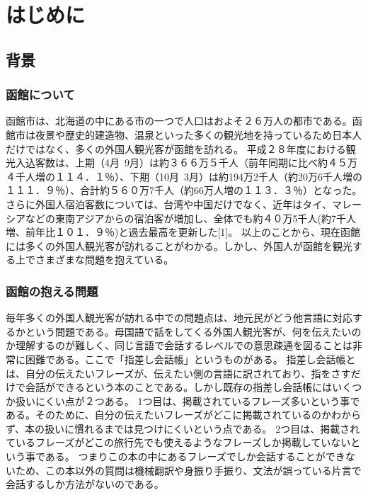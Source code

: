 \documentclass[openany,11pt,papersize]{jsbook}
\begin{document}
\tableofcontents%


\mainmatter%

\chapter{はじめに}

\section{背景}
\subsection{函館について}
 函館市は、北海道の中にある市の一つで人口はおよそ２６万人の都市である。函館市は夜景や歴史的建造物、温泉といった多くの観光地を持っているため日本人だけではなく、多くの外国人観光客が函館を訪れる。
平成２８年度における観光入込客数は、上期（4月~9月）は約３６６万５千人（前年同期に比べ約４５万４千人増の１１４．１％）、下期（10月~3月）は約194万2千人（約20万6千人増の１１１．９％）、合計約５６０万7千人（約66万人増の１１３．３％）となった。
さらに外国人宿泊客数については、台湾や中国だけでなく、近年はタイ、マレーシアなどの東南アジアからの宿泊客が増加し、全体でも約４０万5千人(約7千人増、前年比１０１．９％)と過去最高を更新した[1]。
以上のことから、現在函館には多くの外国人観光客が訪れることがわかる。しかし、外国人が函館を観光する上でさまざまな問題を抱えている。

\subsection{函館の抱える問題}
 毎年多くの外国人観光客が訪れる中での問題点は、地元民がどう他言語に対応するかという問題である。母国語で話をしてくる外国人観光客が、何を伝えたいのか理解するのが難しく、同じ言語で会話するレベルでの意思疎通を図ることは非常に困難である。ここで「指差し会話帳」というものがある。
指差し会話帳とは、自分の伝えたいフレーズが、伝えたい側の言語に訳されており、指をさすだけで会話ができるという本のことである。しかし既存の指差し会話帳にはいくつか扱いにくい点が２つある。
1つ目は、掲載されているフレーズ多いという事である。そのために、自分の伝えたいフレーズがどこに掲載されているのかわからず、本の扱いに慣れるまでは見つけにくいという点である。
2つ目は、掲載されているフレーズがどこの旅行先でも使えるようなフレーズしか掲載していないという事である。
つまりこの本の中にあるフレーズでしか会話することができないため、この本以外の質問は機械翻訳や身振り手振り、文法が誤っている片言で会話するしか方法がないのである。
\end{document}
